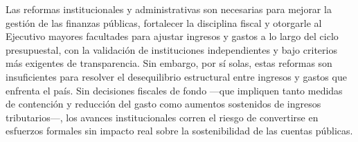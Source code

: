 Las reformas institucionales y administrativas son necesarias para mejorar la gestión de las finanzas públicas, fortalecer la disciplina fiscal y otorgarle al Ejecutivo mayores facultades para ajustar ingresos y gastos a lo largo del ciclo presupuestal, con la validación de instituciones independientes y bajo criterios más exigentes de transparencia. Sin embargo, por sí solas, estas reformas son insuficientes para resolver el desequilibrio estructural entre ingresos y gastos que enfrenta el país. Sin decisiones fiscales de fondo —que impliquen tanto medidas de contención y reducción del gasto como aumentos sostenidos de ingresos tributarios—, los avances institucionales corren el riesgo de convertirse en esfuerzos formales sin impacto real sobre la sostenibilidad de las cuentas públicas.
